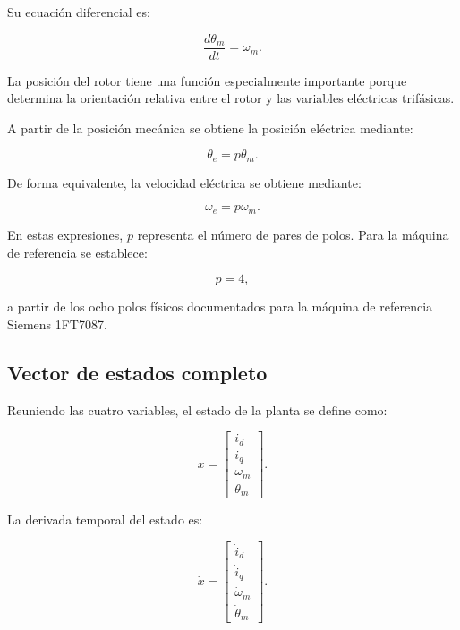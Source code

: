 Su ecuación diferencial es:

\begin{equation}
\frac{d\theta_m}{dt}
=
\omega_m.
\end{equation}

La posición del rotor tiene una función especialmente importante porque determina la orientación relativa entre el rotor y las variables eléctricas trifásicas.

A partir de la posición mecánica se obtiene la posición eléctrica mediante:

\begin{equation}
\theta_e=p\theta_m.
\end{equation}

De forma equivalente, la velocidad eléctrica se obtiene mediante:

\begin{equation}
\omega_e=p\omega_m.
\end{equation}

En estas expresiones, $p$ representa el número de pares de polos. Para la máquina de referencia se establece:

\begin{equation}
p=4,
\end{equation}

a partir de los ocho polos físicos documentados para la máquina de referencia Siemens 1FT7087.

\subsection{Vector de estados completo}

Reuniendo las cuatro variables, el estado de la planta se define como:

\begin{equation}
x =
\begin{bmatrix}
i_d\\
i_q\\
\omega_m\\
\theta_m
\end{bmatrix}.
\end{equation}

La derivada temporal del estado es:

\begin{equation}
\dot{x}
=
\begin{bmatrix}
\dot{i}_d\\
\dot{i}_q\\
\dot{\omega}_m\\
\dot{\theta}_m
\end{bmatrix}.
\end{equation}

